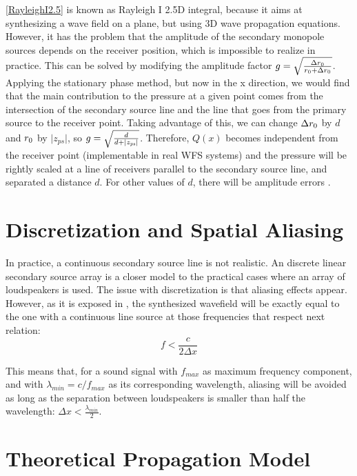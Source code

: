 \autoref{RayleighI2.5} is known as Rayleigh I 2.5D integral, because it aims at synthesizing a wave field on a plane, but using 3D wave propagation equations. However, it has the problem that the amplitude of the secondary monopole sources depends on the receiver position, which is impossible to realize in practice.
This can be solved by modifying the amplitude factor $g = \sqrt{\frac{\Delta {r_0}}{r_0 + \Delta {r_0}}}$.
Applying the stationary phase method, but now in the x direction, we would find that the main contribution to the pressure at a given point comes from the intersection of the secondary source line and the line that goes from the primary source to the receiver point. Taking advantage of this, we can change $\Delta {r_0}$ by $d$ and $r_0$ by $\vert z_\mathit{ps} \vert$, so $g = \sqrt{\frac{d}{d+\vert z_{\PosTheoSubInd[primarySource]} \vert}}$. Therefore, $Q(x)$ becomes independent from the receiver point (implementable in real WFS systems) and the pressure will be rightly scaled at a line of receivers parallel to the secondary source line, and separated a distance $d$. For other values of $d$, there will be amplitude errors \cite{Verheijen}. 

\section{Discretization and Spatial Aliasing}
In practice, a continuous secondary source line is not realistic. An discrete linear secondary source array is a closer model to the practical cases where an array of loudspeakers is used. The issue with discretization is that aliasing effects appear. However, as it is exposed in \cite{Start1997}, the synthesized wavefield will be exactly equal to the one with a continuous line source at those frequencies that respect next relation:
\begin{equation}
f < \frac{c}{2\Delta x}
\end{equation}

This means that, for a sound signal with $f_{max}$ as maximum frequency component, and with $\lambda_{min} = c/f_{max}$ as its corresponding wavelength, aliasing will be avoided as long as the separation between loudspeakers is smaller than half the wavelength: $\Delta x < \frac{\lambda_{min}}{2}$.

\section{Theoretical Propagation Model}
\label{TheoreticalModelLabel}

